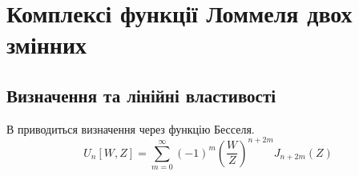\chapter{Комплексі функції Ломмеля двох змінних}
\label{ch:lommel}

\section{Визначення та лінійні властивості}

В \cite{Boersma1961} приводиться визначення через функцію Бесселя.
%
\begin{equation}
U_n \left[ W, Z \right] = \sum \limits_{m = 0}^{\infty} (-1)^m
\left( \frac{W}{Z} \right)^{n + 2m} J_{n + 2m} (Z)
\end{equation}

